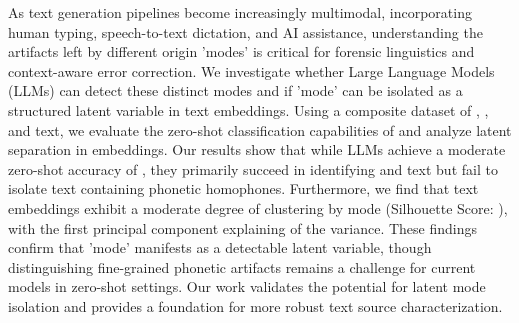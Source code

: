 As text generation pipelines become increasingly multimodal, incorporating human typing, speech-to-text dictation, and AI assistance, understanding the artifacts left by different origin 'modes' is critical for forensic linguistics and context-aware error correction.
We investigate whether Large Language Models (LLMs) can detect these distinct modes and if 'mode' can be isolated as a structured latent variable in text embeddings.
Using a composite dataset of \aigen, \dictated, and \typed text, we evaluate the zero-shot classification capabilities of \gptmini and analyze latent separation in \minilm embeddings.
Our results show that while LLMs achieve a moderate zero-shot accuracy of \accuracy, they primarily succeed in identifying \aigen and \typed text but fail to isolate \dictated text containing phonetic homophones.
Furthermore, we find that text embeddings exhibit a moderate degree of clustering by mode (Silhouette Score: \silhouette), with the first principal component explaining \pcaone of the variance.
These findings confirm that 'mode' manifests as a detectable latent variable, though distinguishing fine-grained phonetic artifacts remains a challenge for current models in zero-shot settings.
Our work validates the potential for latent mode isolation and provides a foundation for more robust text source characterization.
